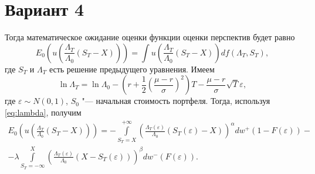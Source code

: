 \documentclass{article}
\begin{document}
\section*{Вариант 4}


Тогда математическое ожидание оценки функции оценки перспектив будет равно
\[
E_0 \left( u \left( \frac{\Lambda_T}{\Lambda_0} (S_T - X) \right) \right) = \int u \left( \frac{\Lambda_T}{\Lambda_0} (S_T - X) \right) df (\Lambda_T, S_T),
\]
где $S_T$ и $\Lambda_T$ есть решение предыдущего уравнения. Имеем
\begin{equation} \label{eq:lambda}
\ln \Lambda_T = \ln \Lambda_0 - \left( r + \frac{1}{2} \left( \frac{\mu - r}{\sigma} \right)^2 \right) T - \frac{\mu - r}{\sigma} \sqrt{T} \varepsilon,
\end{equation}
где $\varepsilon \sim N(0, 1)$, $S_0$ "--- начальная стоимость портфеля. Тогда, используя \eqref{eq:lambda}, получим
\begin{multline}
E_0 \left( u \left( \frac{\Lambda_T}{\Lambda_0} (S_T - X) \right) \right) = -\int\limits_{S_T = X}^{+\infty} \left( \frac{\Lambda_T(\varepsilon)}{\Lambda_0} (S_T(\varepsilon) - X) \right)^\alpha dw^+(1 - F(\varepsilon)) - \\
- \lambda \int\limits_{S_T = -\infty}^{X} \left( \frac{\Lambda_T(\varepsilon)}{\Lambda_0} (X - S_T(\varepsilon)) \right)^\beta dw^-(F(\varepsilon)).
\end{multline}
\end{document}
